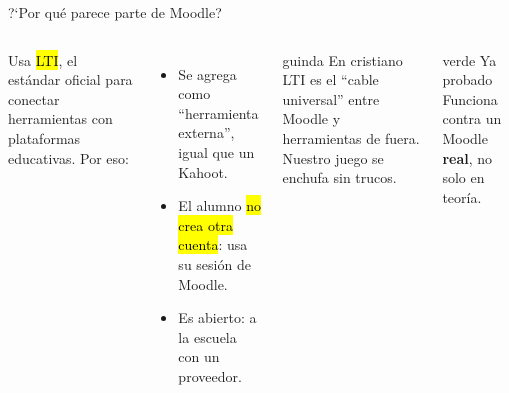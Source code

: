\begin{frame}{?`Por qu\'e parece parte de Moodle?}
\vspace{0.25cm}
\begin{columns}[T]
Usa \hl{LTI}, el est\'andar oficial para conectar herramientas con plataformas
educativas. Por eso:
\vspace{4pt}
\begin{itemize}\setlength\itemsep{6pt}
  \item Se agrega como ``\demi herramienta externa'', igual que un Kahoot.
  \item El alumno \hl{no crea otra cuenta}: usa su sesi\'on de Moodle.
  \item Es abierto:  a la escuela con un proveedor.
\end{itemize}
\begin{tarjetabox}{guinda}
{\demi\color{guinda}En cristiano}\\[2pt]
LTI es el ``cable universal'' entre Moodle y herramientas de fuera. Nuestro juego
se enchufa sin trucos.
\end{tarjetabox}
\begin{tarjetabox}{verde}
{\demi\color{verde}Ya probado}\\[2pt]
Funciona contra un Moodle \textbf{real}, no solo en teor\'ia.
\end{tarjetabox}
\end{columns}
\end{frame}

